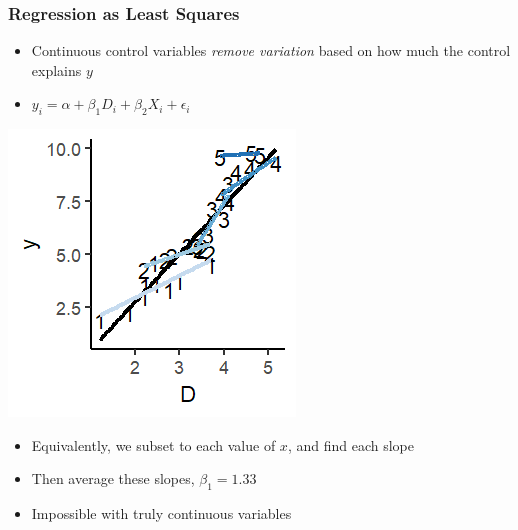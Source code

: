 \documentclass[xcolor=x11names,compress]{beamer}\usepackage[]{graphicx}\usepackage[]{color}
\makeatletter
\def\maxwidth{ %
  \ifdim\Gin@nat@width>\linewidth
    \linewidth
  \else
    \Gin@nat@width
  \fi
}
\newenvironment{knitrout}{}{} %
\renewcommand{\(}{\begin{columns}}
\renewcommand{\)}{\end{columns}}
\newcommand{\<}[1]{\begin{column}{#1}}
\renewcommand{\>}{\end{column}}
\makeatother
\begin{document}
\begin{frame}
\frametitle{Regression as Least Squares}
\begin{itemize}
\item Continuous control variables \textit{remove variation} based on how much the control explains $y$
\item $y_i = \alpha + \beta_1 D_i + \beta_2 X_i + \epsilon_i$
\end{itemize}
\begin{multicols}{2}
\begin{knitrout}
\color{fgcolor}
\includegraphics[width=\maxwidth]{figure/graph_ols_control4-1} 

\end{knitrout}
\columnbreak

\begin{itemize}
\item Equivalently, we subset to each value of $x$, and find each slope
\item Then average these slopes, $\beta_1=1.33$
\item Impossible with truly continuous variables
\end{itemize}
\end{multicols}
\end{frame}
\end{document}
